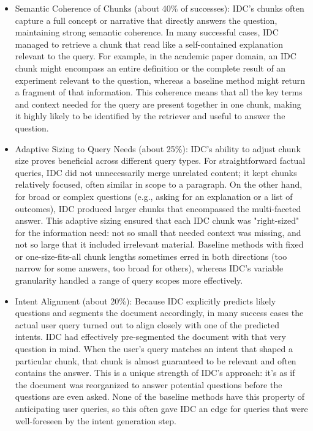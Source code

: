 \documentclass[12pt,a4paper]{report}
\begin{document}
\begin{itemize}
\item Semantic Coherence of Chunks (about 40\% of successes): IDC's chunks often capture a full concept or narrative that directly answers the question, maintaining strong semantic coherence. In many successful cases, IDC managed to retrieve a chunk that read like a self-contained explanation relevant to the query. For example, in the academic paper domain, an IDC chunk might encompass an entire definition or the complete result of an experiment relevant to the question, whereas a baseline method might return a fragment of that information. This coherence means that all the key terms and context needed for the query are present together in one chunk, making it highly likely to be identified by the retriever and useful to answer the question. 

\item Adaptive Sizing to Query Needs (about 25\%): IDC's ability to adjust chunk size proves beneficial across different query types. For straightforward factual queries, IDC did not unnecessarily merge unrelated content; it kept chunks relatively focused, often similar in scope to a paragraph. On the other hand, for broad or complex questions (e.g., asking for an explanation or a list of outcomes), IDC produced larger chunks that encompassed the multi-faceted answer. This adaptive sizing ensured that each IDC chunk was "right-sized" for the information need: not so small that needed context was missing, and not so large that it included irrelevant material. Baseline methods with fixed or one-size-fits-all chunk lengths sometimes erred in both directions (too narrow for some answers, too broad for others), whereas IDC's variable granularity handled a range of query scopes more effectively.

\item Intent Alignment (about 20\%): Because IDC explicitly predicts likely questions and segments the document accordingly, in many success cases the actual user query turned out to align closely with one of the predicted intents. IDC had effectively pre-segmented the document with that very question in mind. When the user's query matches an intent that shaped a particular chunk, that chunk is almost guaranteed to be relevant and often contains the answer. This is a unique strength of IDC's approach: it's as if the document was reorganized to answer potential questions before the questions are even asked. None of the baseline methods have this property of anticipating user queries, so this often gave IDC an edge for queries that were well-foreseen by the intent generation step.


\end{itemize}
\end{document}
